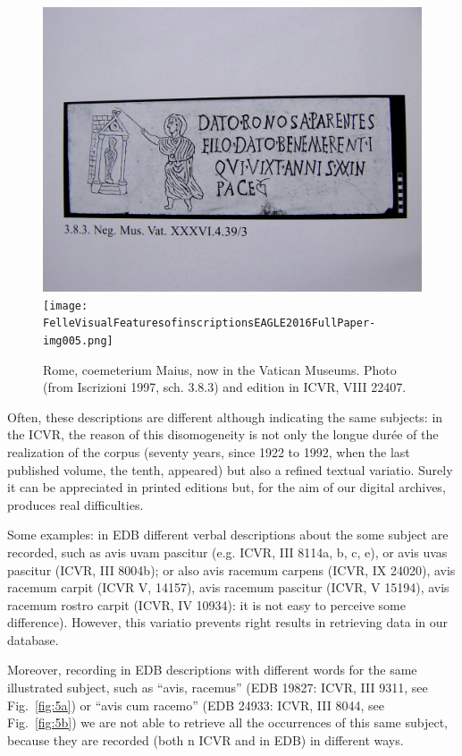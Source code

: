 \documentclass[amsthm,ebook]{saparticle}
\begin{document}
\begin{figure}[!bp]
\centering
 \includegraphics[width=\columnwidth]{FelleVisualFeaturesofinscriptionsEAGLE2016FullPaper-img004.png}
 \texttt{[image: FelleVisualFeaturesofinscriptionsEAGLE2016FullPaper-img005.png]}
\caption{Rome, coemeterium Maius, now in the Vatican Museums. Photo (from Iscrizioni 1997, sch. 3.8.3) and edition in
ICVR, VIII 22407.}
\label{fig:4}
\end{figure}


Often, these descriptions are different although indicating the same subjects: in the ICVR, the reason of this
disomogeneity is not only the longue durée of the realization of the corpus (seventy years, since 1922 to 1992, when
the last published volume, the tenth, appeared) but also a refined textual variatio. Surely it can be appreciated in
printed editions but, for the aim of our digital archives, produces real difficulties. 

Some examples: in EDB different verbal descriptions about the some subject are recorded, such as avis uvam pascitur
(e.g. ICVR, III 8114a, b, c, e), or avis uvas pascitur (ICVR, III 8004b); or also avis racemum carpens (ICVR, IX
24020), avis racemum carpit (ICVR V, 14157), avis racemum pascitur (ICVR, V 15194), avis racemum rostro carpit (ICVR,
IV 10934): it is not easy to perceive some difference). However, this variatio prevents right results in retrieving
data in our database. 

Moreover, recording in EDB descriptions with different words for the same illustrated subject, such as
``avis, racemus'' (EDB 19827: ICVR, III 9311, see Fig.~\ref{fig:5a}) or ``avis cum
racemo'' (EDB 24933: ICVR, III 8044, see Fig.~\ref{fig:5b}) we are not able to retrieve all the occurrences of this
same subject, because they are recorded (both n ICVR and in EDB) in different ways.
\end{document}
